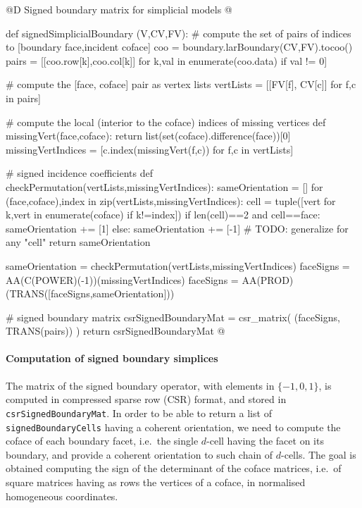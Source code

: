 \documentclass[11pt,oneside]{article}    %
\begin{document}
@D Signed boundary matrix for simplicial models
@{def signedSimplicialBoundary (V,CV,FV):
    # compute the set of pairs of indices to [boundary face,incident coface]
    coo = boundary.larBoundary(CV,FV).tocoo()
    pairs = [[coo.row[k],coo.col[k]] for k,val in enumerate(coo.data) if val != 0]

    # compute the [face, coface] pair as vertex lists
    vertLists = [[FV[f], CV[c]] for f,c in pairs]

    # compute the local (interior to the coface) indices of missing vertices 
    def missingVert(face,coface): return list(set(coface).difference(face))[0]
    missingVertIndices = [c.index(missingVert(f,c)) for f,c in vertLists]

    # signed incidence coefficients
    def checkPermutation(vertLists,missingVertIndices):
        sameOrientation = []
        for (face,coface),index in zip(vertLists,missingVertIndices):
            cell = tuple([vert for k,vert in enumerate(coface) if k!=index])
            if len(cell)==2 and cell==face: sameOrientation += [1]
            else: sameOrientation += [-1]  # TODO: generalize for any "cell"
        return sameOrientation

    sameOrientation = checkPermutation(vertLists,missingVertIndices)
    faceSigns = AA(C(POWER)(-1))(missingVertIndices)
    faceSigns = AA(PROD)(TRANS([faceSigns,sameOrientation]))

    # signed boundary matrix
    csrSignedBoundaryMat = csr_matrix( (faceSigns, TRANS(pairs)) )
    return csrSignedBoundaryMat
@}

\paragraph{Computation of signed boundary simplices}

The matrix of the signed boundary operator, with elements in $\{-1,0,1\}$, is computed in compressed sparse row (CSR) format, and stored in \texttt{csrSignedBoundaryMat}. In order to be able to return a list of \texttt{signedBoundaryCells} having a coherent orientation, we need to compute the coface of each boundary facet, i.e.~the single $d$-cell having the facet on its boundary, and provide a coherent orientation to such chain of $d$-cells. The goal is obtained computing the sign of the determinant of the coface matrices, i.e.~of square matrices having as rows the vertices of a coface, in normalised homogeneous coordinates.
\end{document}
